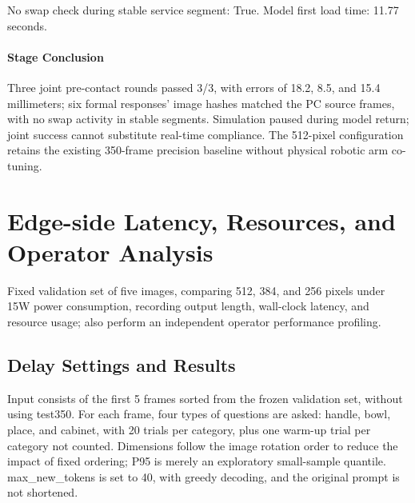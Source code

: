 No swap check during stable service segment: True. Model first load time: 11.77 seconds.


\paragraph{Stage Conclusion} Three joint pre-contact rounds passed 3/3, with errors of 18.2, 8.5, and 15.4 millimeters; six formal responses' image hashes matched the PC source frames, with no swap activity in stable segments. Simulation paused during model return; joint success cannot substitute real-time compliance. The 512-pixel configuration retains the existing 350-frame precision baseline without physical robotic arm co-tuning.



\FloatBarrier

\section{Edge-side Latency, Resources, and Operator Analysis}

\label{stage:s24}

Fixed validation set of five images, comparing 512, 384, and 256 pixels under 15W power consumption, recording output length, wall-clock latency, and resource usage; also perform an independent operator performance profiling.

\subsection{Delay Settings and Results}\label{s24-detail-1}

Input consists of the first 5 frames sorted from the frozen validation set, without using test350. For each frame, four types of questions are asked: handle, bowl, place, and cabinet, with 20 trials per category, plus one warm-up trial per category not counted. Dimensions follow the image rotation order to reduce the impact of fixed ordering; P95 is merely an exploratory small-sample quantile. max\_new\_tokens is set to 40, with greedy decoding, and the original prompt is not shortened.

